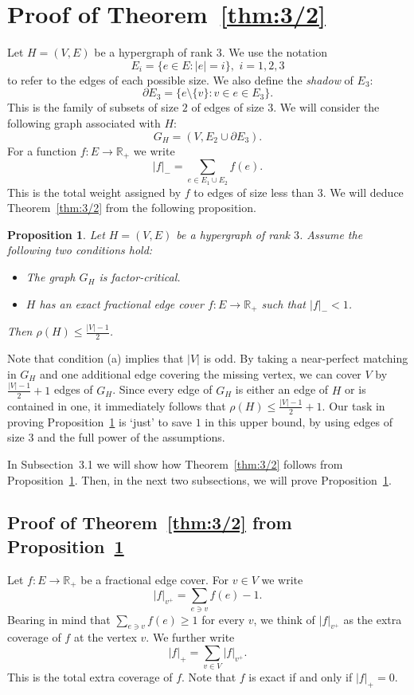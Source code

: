 \documentclass[10pt,a4paper]{amsart}
\newtheorem{proposition}[theorem]{Proposition}
\begin{document}
\section{Proof of Theorem~\ref{thm:3/2}}
Let $H = (V, E)$ be a hypergraph of rank $3$. We use the notation \[ E_i = \{ e \in E: |e| = i\}, \,\, i = 1,2,3\]
to refer to the edges of each possible size. We also define the \emph{shadow} of $E_3$: \[ \partial E_3 = \{ e \setminus \{v\}: v \in e \in E_3\}.\] This is the family of subsets of size $2$ of edges of size $3$. We will consider the following graph associated with $H$: \[G_H = (V, E_2 \cup \partial E_3).\] For a function $f: E \to \mathbb{R}_+$ we write \[ |f|_- = \sum_{e \in E_1 \cup E_2} f(e).\] This is the total weight assigned by $f$ to edges of size less than $3$. We will deduce Theorem~\ref{thm:3/2} from the following proposition.
\begin{proposition} \label{pro:Cover}
Let $H = (V, E)$ be a hypergraph of rank $3$. Assume the following two conditions hold:
\begin{itemize}
    \item[(a)] The graph $G_H$ is factor-critical.
    \item[(b)] $H$ has an exact fractional edge cover $f: E \to \mathbb{R}_+$ such that $|f|_- < 1$.
\end{itemize}
Then $\rho(H) \le \frac{|V|-1}{2}$.
\end{proposition}
Note that condition (a) implies that $|V|$ is odd. By taking a near-perfect matching in $G_H$ and one additional edge covering the missing vertex, we can cover $V$ by $\frac{|V|-1}{2} + 1$ edges of $G_H$. Since every edge of $G_H$ is either an edge of $H$ or is contained in one, it immediately follows that $\rho(H) \le \frac{|V|-1}{2} + 1$. Our task in proving Proposition~\ref{pro:Cover} is `just' to save $1$ in this upper bound, by using edges of size $3$ and the full power of the assumptions.

In Subsection~3.1 we will show how Theorem~\ref{thm:3/2} follows from Proposition~\ref{pro:Cover}. Then, in the next two subsections, we will prove Proposition~\ref{pro:Cover}.

\subsection{Proof of Theorem~\ref{thm:3/2} from Proposition~\ref{pro:Cover}}
Let $f: E \to \mathbb{R}_+$ be a fractional edge cover. For $v \in V$ we write \[ |f|_{v^+} = \sum_{e \ni v} f(e) - 1.\] Bearing in mind that $\sum_{e \ni v} f(e) \ge 1$ for every $v$, we think of $|f|_{v^+}$ as the extra coverage of $f$ at the vertex $v$. We further write \[ |f|_+ = \sum_{v \in V} |f|_{v^+}.\] This is the total extra coverage of $f$. Note that $f$ is exact if and only if $|f|_+ = 0$.
\end{document}
